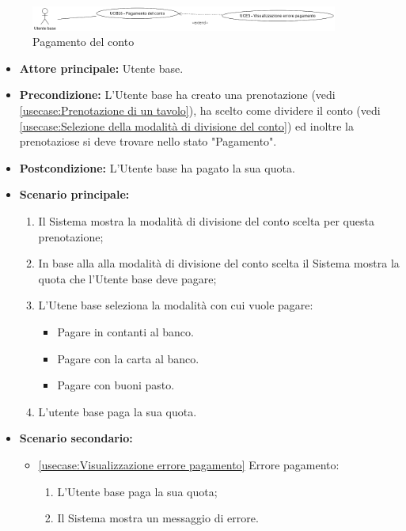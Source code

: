 \label{usecase:Pagamento del conto}

\begin{figure}[h]
	\centering
	\includegraphics[width=0.9\textwidth]{./uml/UCB16.png} 
	\caption{Pagamento del conto}
	\label{fig:UCB15}
  \end{figure}

\begin{itemize}
	\item \textbf{Attore principale:} Utente base.

	\item \textbf{Precondizione:} L'Utente base ha creato una prenotazione (vedi \autoref{usecase:Prenotazione di un tavolo}), ha 
	scelto come dividere il conto (vedi \autoref{usecase:Selezione della modalità di divisione del conto}) ed inoltre la prenotaziose si deve trovare nello stato "Pagamento".

	\item \textbf{Postcondizione:} L'Utente base ha pagato la sua quota.

	\item \textbf{Scenario principale:}
            \begin{enumerate}
				\item Il Sistema mostra la modalità di divisione del conto scelta per questa prenotazione;
                \item In base alla alla modalità di divisione del conto scelta il Sistema mostra la quota che l'Utente base deve pagare;
                \item L'Utene base seleziona la modalità con cui vuole pagare:
                \begin{itemize}
                    \item Pagare in contanti al banco.
                    \item Pagare con la carta al banco.
                    \item Pagare con buoni pasto.
                \end{itemize}
				\item L'utente base paga la sua quota.
	      \end{enumerate}

    \item \textbf{Scenario secondario:}
		  \begin{itemize}
			  \item \autoref{usecase:Visualizzazione errore pagamento} Errore pagamento:
				\begin{enumerate}
					\item L'Utente base paga la sua quota;
					\item  Il Sistema mostra un messaggio di errore.
				\end{enumerate}
		  \end{itemize}
\end{itemize}